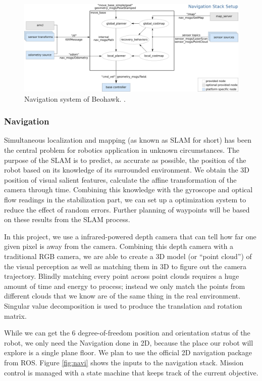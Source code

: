 \documentclass[12pt, letterpaper]{article}
\begin{document}
\begin{figure}[h]
\centering
\includegraphics[width=12cm]{images/overview_tf.png}
\caption{Navigation system of Beohawk. .} 
\label{fig:navi}
\end{figure}

\subsubsection{Navigation}

Simultaneous localization and mapping (as known as SLAM for short) has been the central problem for  robotics application in unknown circumstances. The purpose of the SLAM is to predict, as accurate as possible, the position of the robot based on its knowledge of its surrounded environment. We obtain the 3D position of visual salient features, calculate the affine transformation of the camera through time. Combining this knowledge with the gyroscope and optical flow readings in the stabilization part, we can set up a optimization system to reduce the effect of random errors. Further planning of waypoints will be based on these results from the SLAM process.

In this project, we use a infrared-powered depth camera that can tell how far one given pixel is away from the camera. Combining this depth camera with a traditional RGB camera, we are able to create a 3D model (or “point cloud”) of the visual perception as well as matching them in 3D to figure out the camera trajectory. Blindly matching every point across point clouds requires a huge amount of time and energy to process; instead we only match the points from different clouds that we know are of the same thing in the real environment. Singular value decomposition is used to produce the translation and rotation matrix.

While we can get the 6 degree-of-freedom position and orientation status of the robot, we only need the Navigation done in 2D, because the place our robot will explore is a single plane floor. We plan to use the official 2D navigation package from ROS. Figure \eqref{fig:navi} shows the inputs to the navigation stack. Mission control is managed with a state machine that keeps track of the current objective.  
\end{document}
